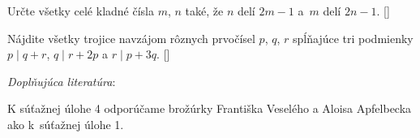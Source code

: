 {Určte všetky celé kladné čísla $m$, $n$ také, že $n$ delí $2m-1$
a~$m$ delí $2n-1$. []


Nájdite všetky trojice navzájom rôznych prvočísel $p$, $q$,
$r$ spĺňajúce tri podmienky $p\mid q+r$, $q\mid r+2p$ a $r\mid p+3q$.
[]


{\everypar{}
\smallskip
\emph{Doplňujúca literatúra}:

K súťažnej úlohe 4 odporúčame
brožúrky Františka Veselého 
a Aloisa Apfelbecka
ako k~súťažnej úlohe 1.

\smallskip
}

}

